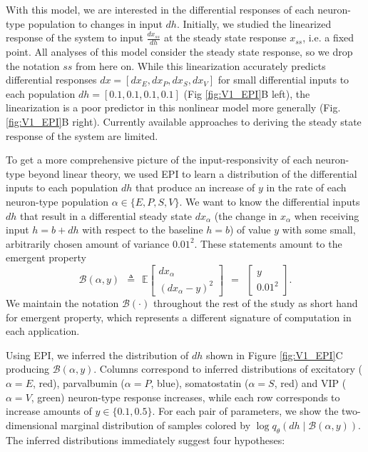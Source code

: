 \documentclass[11pt]{article}
\begin{document}
With this model, we are interested in the differential responses of each neuron-type population to changes in input $dh$. 
Initially, we studied the linearized response of the system to input $\frac{dx_{ss}}{dh}$ at the steady state response $x_{ss}$, i.e. a fixed point. 
All analyses of this model consider the steady state response, so we drop the notation $ss$ from here on.
While this linearization accurately predicts differential responses $dx = \left[ dx_{E} , dx_{P} , dx_{S} ,dx_{V} \right]$  for small differential inputs to each population $dh = \left[ 0.1 , 0.1 , 0.1 , 0.1 \right]$ (Fig \ref{fig:V1_EPI}B left), the linearization is a poor predictor in this nonlinear model more generally (Fig. \ref{fig:V1_EPI}B right).  Currently available approaches to deriving the steady state response of the system are limited.

To get a more comprehensive picture of the input-responsivity of each neuron-type beyond linear theory, we used EPI to learn a distribution of the differential inputs to each population $dh$ that produce an increase of $y$ in the rate of each neuron-type population $\alpha \in \{E, P, S, V \}$.  
We want to know the differential inputs $dh$ that result in a differential steady state $dx_{\alpha}$ (the change in $x_{\alpha}$ when receiving input $h=b + dh$ with respect to the baseline $h = b$) of value $y$ with some small, arbitrarily chosen amount of variance  $0.01^2$.   
These statements amount to the emergent property 
\begin{equation}
\mathcal{B}(\alpha, y) ~~\triangleq~~ 
\mathbb{E} \begin{bmatrix} dx_{\alpha} \\ (dx_{\alpha} - y)^2 \end{bmatrix} ~~=~~ \begin{bmatrix} y \\ 0.01^2 \end{bmatrix}.
\end{equation}
We maintain the notation $\mathcal{B}(\cdot)$ throughout the rest of the study as short hand for emergent property, which represents a different signature of computation in each application. 

Using EPI, we inferred the distribution of $dh$ shown in Figure \ref{fig:V1_EPI}C producing $\mathcal{B}(\alpha, y)$.  
Columns correspond to inferred distributions of excitatory ($\alpha=E$, red), parvalbumin ($\alpha=P$, blue), somatostatin ($\alpha=S$, red) and VIP ($\alpha=V$, green) neuron-type response increases, while each row corresponds to increase amounts of $y \in \{0.1, 0.5\}$.  For each pair of parameters, we show the two-dimensional marginal distribution of samples colored by $\log q_\theta(dh \mid \mathcal{B}(\alpha, y))$.  The inferred distributions immediately suggest four hypotheses: \\
\end{document}
